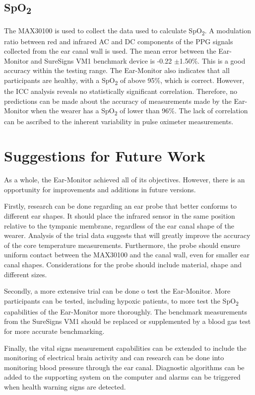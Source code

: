 \subsection{SpO\textsubscript{2}}
The MAX30100 is used to collect the data used to calculate SpO\textsubscript{2}. A modulation ratio between red and infrared AC and DC components of the PPG signals collected from the ear canal wall is used. The mean error between the Ear-Monitor and SureSigns VM1 benchmark device is -0.22 $\pm$1.50\%. This is a good accuracy within the testing range. The Ear-Monitor also indicates that all participants are healthy, with a SpO\textsubscript{2} of above 95\%, which is correct. However, the ICC analysis reveals no statistically  significant correlation. Therefore, no predictions can be made about the accuracy of measurements made by the Ear-Monitor when the wearer has a SpO\textsubscript{2} of lower than 96\%. The lack of correlation can be ascribed to the inherent variability in pulse oximeter measurements.

\section{Suggestions for Future Work}
As a whole, the Ear-Monitor achieved all of its objectives. However, there is an opportunity for improvements and additions in future versions.

\medskip
Firstly, research can be done regarding an ear probe that better conforms to different ear shapes. It should place the infrared sensor in the same position relative to the tympanic membrane, regardless of the ear canal shape of the wearer. Analysis of the trial data suggests that will greatly improve the accuracy of the core temperature measurements. Furthermore, the probe should ensure uniform contact between the MAX30100 and the canal wall, even for smaller ear canal shapes. Considerations for the probe should include material, shape and different sizes.

\medskip
Secondly, a more extensive trial can be done o test the Ear-Monitor. More participants can be tested, including hypoxic patients, to more test the SpO\textsubscript{2} capabilities of the Ear-Monitor more thoroughly. The benchmark measurements from the SureSigns VM1 should be replaced or supplemented by a blood gas test for more accurate benchmarking.

\medskip
Finally, the vital signs measurement capabilities can be extended to include the monitoring of electrical brain activity and can research can be done into monitoring blood pressure through the ear canal. Diagnostic algorithms can be added to the supporting system on the computer and alarms can be triggered when health warning signs are detected.

